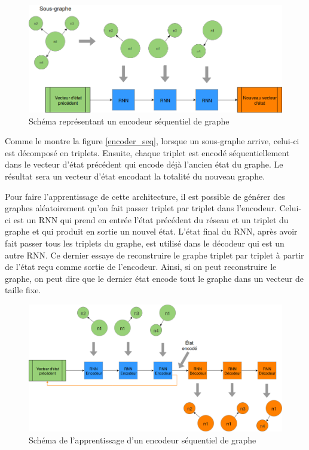 \begin{figure}[H] 
	\centering
	\includegraphics[width=0.8\linewidth]{images/Conception/DM/encoder_seq.png}
	\caption{Schéma représentant un encodeur séquentiel de graphe}
	
\end{figure}\label{encoder_seq}
Comme le montre la figure \ref{encoder_seq}, lorsque un sous-graphe arrive, celui-ci est décomposé en triplets. Ensuite, chaque triplet est encodé séquentiellement dans le vecteur d'état précédent qui encode déjà l'ancien état du graphe. Le résultat sera un vecteur d'état encodant la totalité du nouveau graphe.
\par Pour faire l'apprentissage de cette architecture, il est possible de générer des graphes aléatoirement qu'on fait passer triplet par triplet dans l'encodeur. Celui-ci est un RNN qui prend en entrée l'état précédent du réseau et un triplet du graphe et qui produit en sortie un nouvel état. L'état final du RNN, après avoir fait passer tous les triplets du graphe, est utilisé dans le décodeur qui est un autre RNN. Ce dernier essaye de reconstruire le graphe triplet par triplet à partir de l'état reçu comme sortie de l'encodeur. Ainsi, si on peut reconstruire le graphe, on peut dire que le dernier état encode tout le graphe dans un vecteur de taille fixe.
\begin{figure}[H] 
	\centering
	\includegraphics[width=0.9\linewidth]{images/Conception/DM/encoder_seq_train.png}
	\caption{Schéma de l'apprentissage d'un encodeur séquentiel de graphe}
	
\end{figure}\label{encoder_seq_train}
